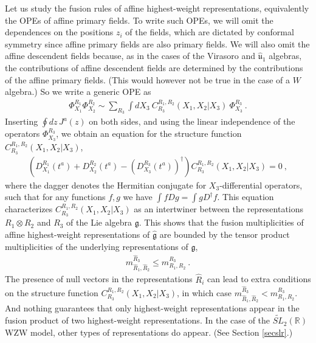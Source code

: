 \documentclass[12pt, a4paper, notitlepage, twoside]{report}
\numberwithin{equation}{section}
\theoremstyle{break}
\begin{document}
Let us study the fusion rules of affine highest-weight representations, equivalently the OPEs of affine primary fields.
To write such OPEs, we will omit the dependences on the positions $z_i$ of the fields, which are dictated by conformal symmetry since affine primary fields are also primary fields.
We will also omit the affine descendent fields because, as in the cases of the Virasoro and $\hat{\mathfrak{u}}_1$ algebras, the contributions of affine descendent fields are determined by the contributions of the affine primary fields. (This would however not be true in the case of a $W$ algebra.) So we write a generic OPE as 
\begin{align}
 \Phi^{R_1}_{X_1}\Phi^{R_2}_{X_2} \sim \sum_{R_3} \int dX_3\ C^{R_1,R_2}_{R_3}(X_1,X_2|X_3)\ \Phi^{R_3}_{X_3}\ .
\end{align}
Inserting $\oint dz\, J^a(z)$ on both sides, and using the linear independence of the operators $\Phi^{R_3}_{X_3}$, we obtain an equation for the structure function $C^{R_1,R_2}_{R_3}(X_1,X_2|X_3)$,
\begin{align}
 \left(D_{X_1}^{R_1}(t^a)+D_{X_2}^{R_2}(t^a)-\left(D_{X_3}^{R_3}(t^a)\right)^\dagger\right) C^{R_1,R_2}_{R_3}(X_1,X_2|X_3) = 0\ ,
\label{dddc}
\end{align}
where the dagger denotes the Hermitian conjugate for $X_3$-differential operators, such that for any functions $f,g$ we have 
$\int fDg =\int g D^\dagger f$.
This equation characterizes $C^{R_1,R_2}_{R_3}(X_1,X_2|X_3)$ as an intertwiner between the representations $R_1\otimes R_2$ and $R_3$ of the Lie algebra $\mathfrak{g}$.
This shows that the fusion multiplicities of affine highest-weight representations of $\hat{\mathfrak{g}}$ are bounded by the tensor product multiplicities of the underlying representations of $\mathfrak{g}$, 
\begin{align}
 m_{\hat{R}_1,\hat{R}_2}^{\hat{R}_3} \leq m_{R_1,R_2}^{R_3}\ .
\end{align}
The presence of null vectors in the representations $\hat{R}_i$ can lead to extra conditions on the structure function $C^{R_1,R_2}_{R_3}(X_1,X_2|X_3)$, in which case $m_{\hat{R}_1,\hat{R}_2}^{\hat{R}_3} < m_{R_1,R_2}^{R_3}$. 
And nothing guarantees that only highest-weight representations appear in the fusion product of two highest-weight representations. 
In the case of the $\widetilde{SL}_2(\mathbb{R})$ WZW model, other types of representations do appear. (See Section \ref{secslr}.) 
\end{document}
